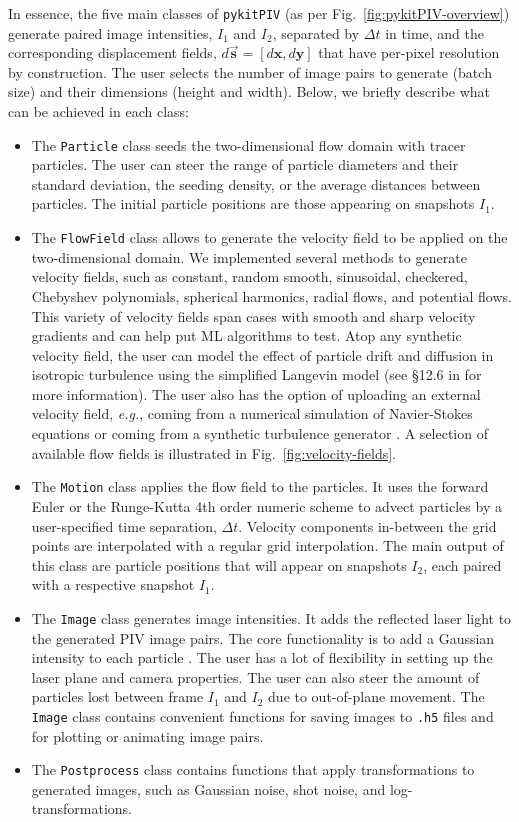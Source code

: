 \documentclass[a4paper,fleqn]{cas-dc}
\begin{document}
In essence, the five main classes of \texttt{pykitPIV} (as per Fig.~\ref{fig:pykitPIV-overview}) generate paired image intensities, $I_1$ and $I_2$, separated by $\Delta t$ in time, and the corresponding displacement fields, $d\vec{\mathbf{s}} = [d \mathbf{x}, d\mathbf{y}]$ that have per-pixel resolution by construction. The user selects the number of image pairs to generate (batch size) and their dimensions (height and width). Below, we briefly describe what can be achieved in each class:
\begin{itemize}
\item The \texttt{Particle} class seeds the two-dimensional flow domain with tracer particles. The user can steer the range of particle diameters and their standard deviation, the seeding density, or the average distances between particles. The initial particle positions are those appearing on snapshots $I_1$.
\item The \texttt{FlowField} class allows to generate the velocity field to be applied on the two-dimensional domain. We implemented several methods to generate velocity fields, such as constant, random smooth, sinusoidal, checkered, Chebyshev polynomials, spherical harmonics, radial flows, and potential flows. This variety of velocity fields span cases with smooth and sharp velocity gradients and can help put ML algorithms to test. Atop any synthetic velocity field, the user can model the effect of particle drift and diffusion in isotropic turbulence using the simplified Langevin model (see \S12.6 in \cite{pope2001turbulent} for more information). The user also has the option of uploading an external velocity field, \textit{e.g.}, coming from a numerical simulation of Navier-Stokes equations or coming from a synthetic turbulence generator \citep{saad2017scalable, richards2018fast}. A selection of available flow fields is illustrated in Fig.~\ref{fig:velocity-fields}.
\item The \texttt{Motion} class applies the flow field to the particles. It uses the forward Euler or the Runge-Kutta 4th order numeric scheme to advect particles by a user-specified time separation, $\Delta t$. Velocity components in-between the grid points are interpolated with a regular grid interpolation. The main output of this class are particle positions that will appear on snapshots $I_2$, each paired with a respective snapshot $I_1$.
\item The \texttt{Image} class generates image intensities. It adds the reflected laser light to the generated PIV image pairs. The core functionality is to add a Gaussian intensity to each particle \citep{olsen2000out, rabault2017performing}. The user has a lot of flexibility in setting up the laser plane and camera properties. The user can also steer the amount of particles lost between frame $I_1$ and $I_2$ due to out-of-plane movement. The \texttt{Image} class contains convenient functions for saving images to \texttt{.h5} files and for plotting or animating image pairs.
\item The \texttt{Postprocess} class contains functions that apply transformations to generated images, such as Gaussian noise, shot noise, and log-transformations.
\end{itemize}
\end{document}
